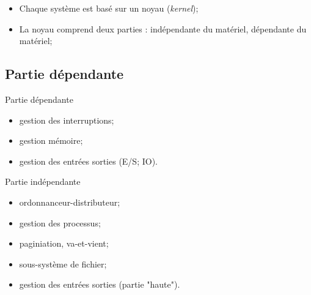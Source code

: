 \begin{frame}{\sectitle}
\begin{block}{\subsectitle}
\begin{itemize}
    \item Chaque système est basé sur un noyau (\textit{kernel});
    \item La noyau comprend deux parties : indépendante du matériel, dépendante
    du matériel;
\end{itemize}
\end{block}

\def\subsectitle{Partie dépendante}
\subsection{\subsectitle}
\begin{block}{\subsectitle}
\begin{itemize}
    \item gestion des interruptions;
    \item gestion mémoire;
    \item gestion des entrées sorties (E/S; IO).
\end{itemize}

\end{block}

\begin{block}{Partie indépendante}
\begin{itemize}
    \item ordonnanceur-distributeur;
    \item gestion des processus;
    \item paginiation, va-et-vient;
    \item sous-système de fichier;
    \item gestion des entrées sorties (partie "haute").
\end{itemize}

\end{block}

\end{frame}



